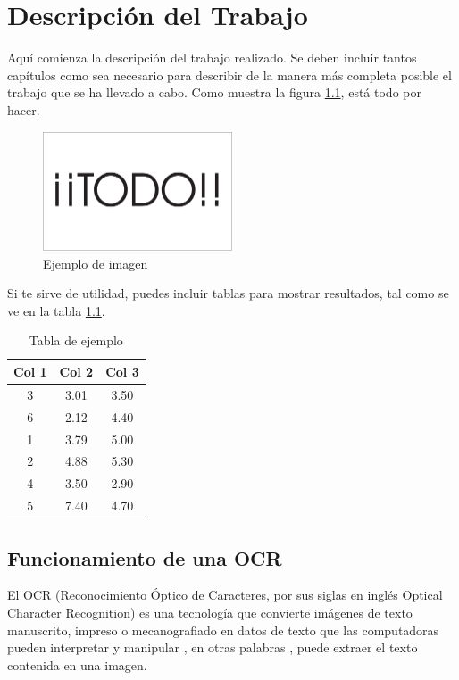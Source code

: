 \chapter{Descripción del Trabajo}
\label{cap:descripcionTrabajo}

Aquí comienza la descripción del trabajo realizado. Se deben incluir tantos capítulos como sea necesario para describir de la manera más completa posible el trabajo que se ha llevado a cabo. Como muestra la figura \ref{fig:sampleImage}, está todo por hacer.

\begin{figure}[h]
	\centering
	\includegraphics[width = 0.5\textwidth]{Imagenes/Vectorial/Todo.pdf}
	\caption{Ejemplo de imagen}
	\label{fig:sampleImage}
\end{figure}

Si te sirve de utilidad,  puedes incluir tablas para mostrar resultados, tal como se ve en la tabla \ref{tab:sampleTable}.


\begin{table}
	\centering
	\begin{tabular}{c|c|c}
		\textbf{Col 1} & \textbf{Col 2} & \textbf{Col 3} \\
		\hline\hline
		3 & 3.01 & 3.50\\
		6 & 2.12 & 4.40\\
		1 & 3.79 & 5.00\\
		2 & 4.88 & 5.30\\
		4 & 3.50 & 2.90\\
		5 & 7.40 & 4.70\\
		\hline
	\end{tabular}
	\caption{Tabla de ejemplo}
	\label{tab:sampleTable}
\end{table}

\section{Funcionamiento de una OCR}
El OCR (Reconocimiento Óptico de Caracteres, por sus siglas en inglés Optical Character Recognition) es una tecnología que convierte imágenes de texto manuscrito, impreso o mecanografiado en datos de texto que las computadoras pueden interpretar y manipular , en otras palabras , puede extraer el texto contenida en una imagen.

